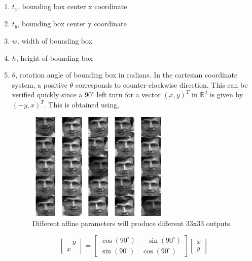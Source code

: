 \begin{enumerate}
\item $t_x$, bounding box center x coordinate
\item $t_y$, bounding box center y coordinate
\item $w$, width of bounding box
\item $h$, height of bounding box
\item $\theta$, rotation angle of bounding box in radians.  In the cartesian coordinate system, a positive $\theta$ corresponds to counter-clockwise direction.  This can be verified quickly since a $90^{\circ}$ left turn for a vector $(x,y)^T$ in $\mathbb{R}^2$ is given by $(-y,x)^T$.  This is obtained using,

								\begin{figure}[t]
								\centering
								\includegraphics[width=0.65\textwidth]{thesis/affineCandidates.pdf}
								\caption{Different affine parameters will produce different 33x33 outputs.}
								\label{Fig:affine_candidates}
								\end{figure}
\begin{equation}
\left[\begin{array}{ccc}
-y 
\\ 
x
\end{array}
\right]=
\left[
\begin{array}{rrr}
\cos(90^{\circ}) & -\sin(90^{\circ}) \\
\sin(90^{\circ}) & \cos(90^{\circ})
\end{array}
\right]
\left[\begin{array}{ccc}
x 
\\ 
y
\end{array}
\right]
\end{equation}


\end{enumerate}

